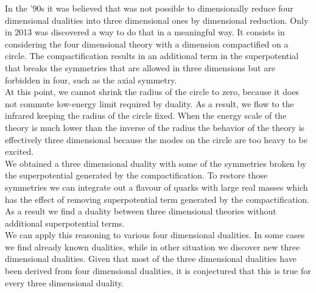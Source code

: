 In the '90s it was believed that was not possible to dimensionally reduce four dimensional dualities into three dimensional ones by dimensional reduction. 
Only in 2013 was discovered a way to do that in a meaningful way. 
It consists in considering the four dimensional theory with a dimension compactified on a circle. 
The compactification results in an additional term in the superpotential that breaks the symmetries that are allowed in three dimensions but are forbidden in four, such as the axial symmetry.\\
At this point, we cannot shrink the radius of the circle to zero, because it does not commute low-energy limit required by duality.
As a result, we flow to the infrared keeping the radius of the circle fixed.
When the energy scale of the theory is much lower than the inverse of the radius the behavior of the theory is effectively three dimensional because the modes on the circle are too heavy to be excited.\\
We obtained a three dimensional duality with some of the symmetries broken by the superpotential generated by the compactification. 
To restore those symmetries we can integrate out a flavour of quarks with large real masses which has the effect of removing superpotential term generated by the compactification. \\
As a result we find a duality between three dimensional theories without additional superpotential terms.\\
We can apply this reasoning to various four dimensional dualities. 
In some cases we find already known dualities, while in other situation we discover new three dimensional dualities. 
Given that most of the three dimensional dualities have been derived from four dimensional dualities, it is conjectured that this is true for every three dimensional duality.\\

